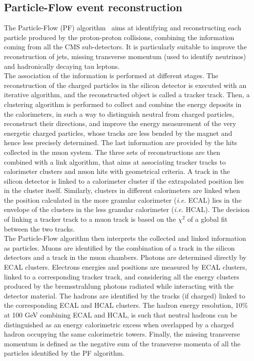 \subsection{Particle-Flow event reconstruction}
The Particle-Flow (PF) algorithm~\cite{Sirunyan:2270046} aims at identifying and reconstructing each particle produced by the proton-proton collisions, combining the information coming from all the CMS sub-detectors. It is particularly suitable to improve the reconstruction of jets, missing transverse momentum (used to identify neutrinos) and hadronically decaying tau leptons.\\
The association of the information is performed at different stages. The reconstruction of the charged particles in the silicon detector is executed with an iterative algorithm, and the reconstructed object is called a tracker track. Then, a clustering algorithm is performed to collect and combine the energy deposits in the calorimeters, in such a way to distinguish neutral from charged particles, reconstruct their directions, and improve the energy measurement of the very energetic charged particles, whose tracks are less bended by the magnet and hence less precisely determined. The last information are provided by the hits collected in the muon system. The three sets of reconstructions are then combined with a link algorithm, that aims at associating tracker tracks to calorimeter clusters and muon hits with geometrical criteria. A track in the silicon detector is linked to a calorimeter cluster if the extrapolated position lies in the cluster itself. Similarly, clusters in different calorimeters are linked when the position calculated in the more granular calorimeter (\textit{i.e.} ECAL) lies in the envelope of the clusters in the less granular calorimeter (\textit{i.e.} HCAL). The decision of linking a tracker track to a muon track is based on the $\chi^2$ of a global fit between the two tracks.\\
The Particle-Flow algorithm then interprets the collected and linked information as particles. Muons are identified by the combination of a track in the silicon detectors and a track in the muon chambers. Photons are determined directly by ECAL clusters. Electrons energies and positions are measured by ECAL clusters, linked to a corresponding tracker track, and considering all the energy clusters produced by the bremsstrahlung photons radiated while interacting with the detector material. The hadrons are identified by the tracks (if charged) linked to the corresponding ECAL and HCAL clusters. The hadron energy resolution, 10\% at 100 GeV combining ECAL and HCAL, is such that neutral hadrons can be distinguished as an energy calorimetric excess when overlapped by a charged hadron occupying the same calorimetric towers. Finally, the missing transverse momentum is defined as the negative sum of the transverse momenta of all the particles identified by the PF algorithm.\\

